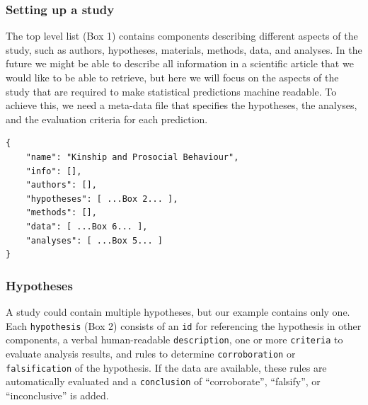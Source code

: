 \documentclass[english,doc,floatsintext]{apa6}
\begin{document}
\hypertarget{setting-up-a-study}{%
\subsubsection{Setting up a study}\label{setting-up-a-study}}

The top level list (Box 1) contains components describing different aspects of the study, such as authors, hypotheses, materials, methods, data, and analyses. In the future we might be able to describe all information in a scientific article that we would like to be able to retrieve, but here we will focus on the aspects of the study that are required to make statistical predictions machine readable. To achieve this, we need a meta-data file that specifies the hypotheses, the analyses, and the evaluation criteria for each prediction.

\begin{tcolorbox}[colback=black!5!white,colframe=white!5!black,title=Box 1. The top-level structure of the machine-readable study description.]
\begin{verbatim}
{
    "name": "Kinship and Prosocial Behaviour",
    "info": [],
    "authors": [],
    "hypotheses": [ ...Box 2... ],
    "methods": [],
    "data": [ ...Box 6... ],
    "analyses": [ ...Box 5... ]
}
\end{verbatim}
\end{tcolorbox}

\hypertarget{hypotheses}{%
\subsubsection{Hypotheses}\label{hypotheses}}

A study could contain multiple hypotheses, but our example contains only one. Each \texttt{hypothesis} (Box 2) consists of an \texttt{id} for referencing the hypothesis in other components, a verbal human-readable \texttt{description}, one or more \texttt{criteria} to evaluate analysis results, and rules to determine \texttt{corroboration} or \texttt{falsification} of the hypothesis. If the data are available, these rules are automatically evaluated and a \texttt{conclusion} of \enquote{corroborate}, \enquote{falsify}, or \enquote{inconclusive} is added.
\end{document}
